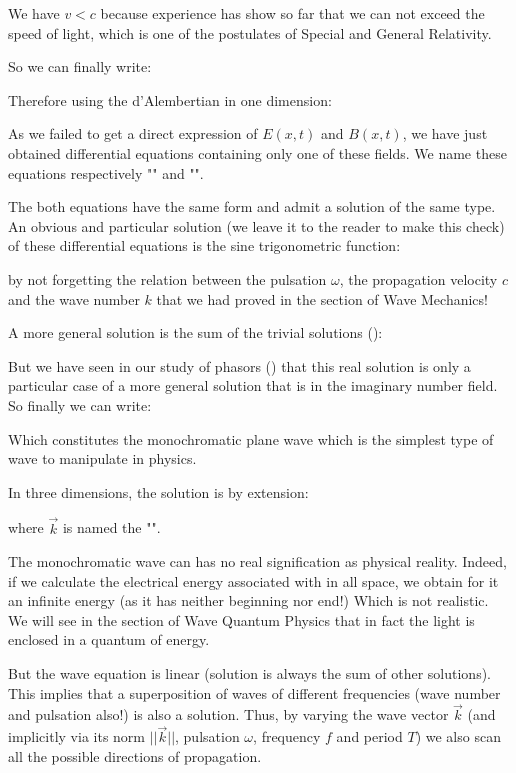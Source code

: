 	We have $v<c$ because experience has show so far that we can not exceed the speed of light, which is one of the postulates of Special and General Relativity.

	So we can finally write:
	
	Therefore using the d'Alembertian in one dimension:
	
	As we failed to get a direct expression of $E(x, t)$ and $B (x, t)$, we have just obtained differential equations containing only one of these fields. We name these equations respectively "" and "".

	The both equations have the same form and admit a solution of the same type. An obvious and particular solution (we leave it to the reader to make this check) of these differential equations is the sine trigonometric function:
	
	by not forgetting the relation between the pulsation $\omega$, the propagation velocity $c$ and the wave number $k$ that we had proved in the section of Wave Mechanics!

	A more general solution is the sum of the trivial solutions ():
	
	But we have seen in our study of phasors () that this real solution is only a particular case of a more general solution that is in the imaginary number field. So finally we can write:
	
	Which constitutes the monochromatic plane wave which is the simplest type of wave to manipulate in physics.

	In three dimensions, the solution is by extension:
	
	where $\vec{k}$ is named the "".
	\begin{tcolorbox}[title=Remark,colframe=black,arc=10pt]
	The monochromatic wave can has no real signification as physical reality. Indeed, if we calculate the electrical energy associated with in all space, we obtain for it an infinite energy (as it has neither beginning nor end!) Which is not realistic. We will see in the section of Wave Quantum Physics that in fact the light is enclosed in a quantum of energy.
	\end{tcolorbox}
	But the wave equation is linear (solution is always the sum of other solutions). This implies that a superposition of waves of different frequencies (wave number and pulsation also!) is also a solution. Thus, by varying the wave vector $\vec{k}$ (and implicitly via its norm $||\vec{k}||$, pulsation $\omega$, frequency $f$ and period $T$) we also scan all the possible directions of propagation.


